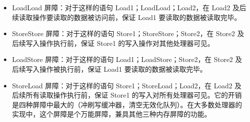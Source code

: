 \documentclass[../../../interview-questions.tex]{subfiles}
\begin{document}
\begin{itemize}
    \item {LoadLoad 屏障：对于这样的语句 Load1；LoadLoad；Load2，在 Load2 及后续读取操作要读取的数据被访问前，保证 Load1 要读取的数据被读取完毕。}
    \item {StoreStore 屏障：对于这样的语句 Store1；StoreStore；Store2，在 Store2 及后续写入操作执行前，保证 Store1 的写入操作对其他处理器可见。}
    \item {LoadStore 屏障：对于这样的语句 Load1；LoadStore；Store2，在 Store2 及后续写入操作被执行前，保证 Load1 要读取的数据被读取完毕。}
    \item {StoreLoad 屏障：对于这样的语句 Store1；StoreLoad；Load2，在 Load2 及后续所有读取操作执行前，保证 Store1 的写入对所有处理器可见。它的开销是四种屏障中最大的（冲刷写缓冲器，清空无效化队列）。在大多数处理器的实现中，这个屏障是个万能屏障，兼具其他三种内存屏障的功能。}
\end{itemize}
\end{document}
